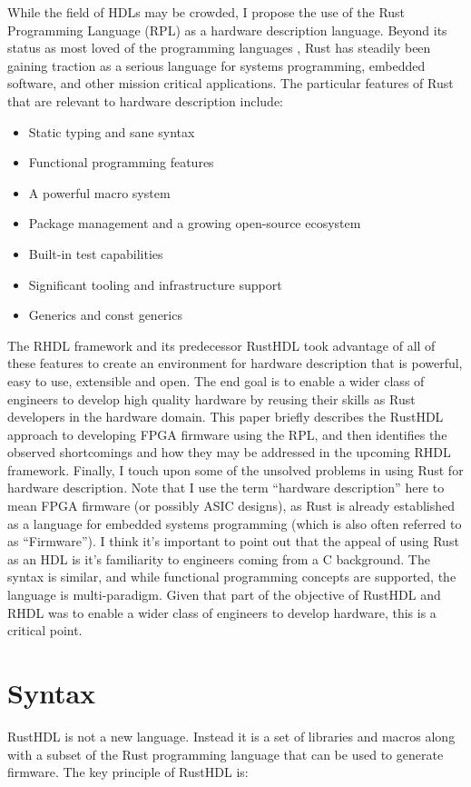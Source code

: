 \documentclass[sigplan,screen,sigconf]{acmart}
\begin{document}
While the field of HDLs may be crowded, I propose the use of the Rust Programming Language (RPL)
as a hardware description language.  Beyond its status as most loved of the programming languages \cite{b0},
Rust has steadily been gaining traction as a serious language for systems programming, embedded 
software, and other mission critical applications.  The particular features of Rust that are 
relevant to hardware description include:
\begin{itemize}
\item Static typing and sane syntax
\item Functional programming features
\item A powerful macro system
\item Package management and a growing open-source ecosystem
\item Built-in test capabilities
\item Significant tooling and infrastructure support
\item Generics and const generics
\end{itemize}
The RHDL framework and its predecessor RustHDL took advantage of all of these features to
create an environment for hardware description that is powerful, easy to use, extensible and
open.  The end goal is to enable a wider class of engineers to develop high quality hardware
by reusing their skills as Rust developers in the hardware domain.  This paper briefly describes
the RustHDL approach to developing FPGA firmware using the RPL, and then identifies the
observed shortcomings and how they may be addressed in the upcoming RHDL framework.  
Finally, I touch upon some of the unsolved problems in using Rust for hardware description.  Note 
that I use the term ``hardware description'' here to mean FPGA firmware (or possibly ASIC designs), 
as Rust is already established as a language for embedded systems programming (which is also often
referred to as ``Firmware'').  I think it's important to point out that the appeal of using Rust 
as an HDL is it's familiarity to engineers coming from a C background.  The syntax is similar, and
while functional programming concepts are supported, the language is multi-paradigm.  Given that 
part of the objective of RustHDL and RHDL was to enable a wider class of engineers to develop
hardware, this is a critical point.

\section{Syntax}
RustHDL is not a new language.  Instead it is a set of libraries and macros along with a 
subset of the Rust programming language that can be used to generate firmware.  The key
principle of RustHDL is:
\end{document}
